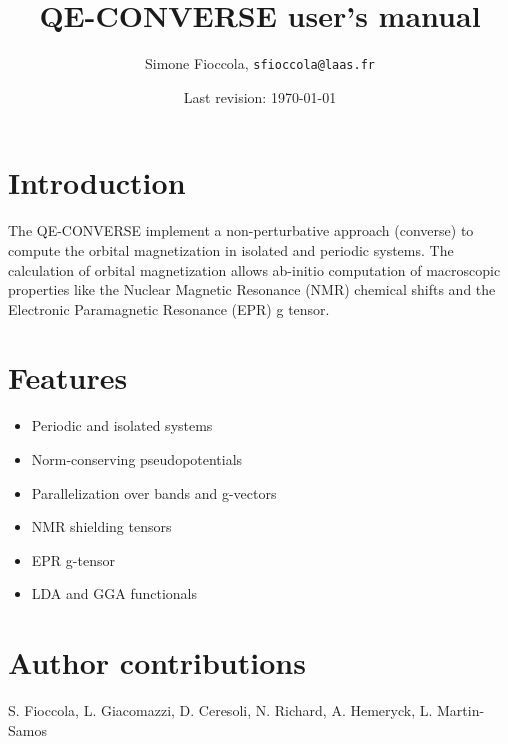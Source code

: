 \documentclass[a4paper,11pt,twoside]{article}
\title{QE-CONVERSE user's manual}
\author{Simone Fioccola, \texttt{sfioccola@laas.fr}}
\date{Last revision: \today}
\begin{document}
\maketitle
\thispagestyle{empty}

\section{Introduction}
The QE-CONVERSE implement a non-perturbative approach (converse) to compute the orbital magnetization in isolated and periodic systems. The calculation of orbital magnetization allows ab-initio computation of macroscopic properties like the Nuclear Magnetic Resonance (NMR) chemical shifts and the Electronic Paramagnetic Resonance (EPR) g tensor.

\section{Features}
\begin{itemize}
  \item Periodic and isolated systems
  \item Norm-conserving pseudopotentials
  \item Parallelization over bands and g-vectors
  \item NMR shielding tensors 
  \item EPR g-tensor
  \item LDA and GGA functionals
\end{itemize}

\section{Author contributions}
{
  S. Fioccola, L. Giacomazzi, D. Ceresoli, N. Richard, A. Hemeryck, L. Martin-Samos
} 
\end{document}
